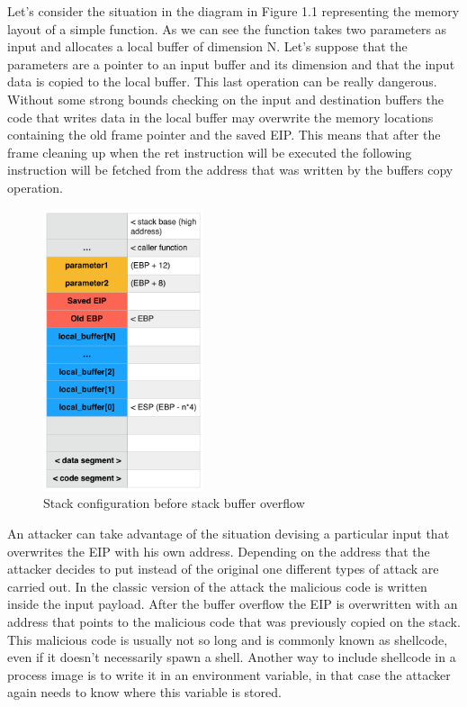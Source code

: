 \documentclass[Lau,binding=0.6cm]{sapthesis}
\begin{document}
Let’s consider the situation in the diagram in Figure 1.1 representing the memory layout of a simple function. As we can see the function takes two parameters as input and allocates a local buffer of dimension N. 
Let’s suppose that the parameters are a pointer to an input buffer and its dimension and that the input data is copied to the local buffer. This last operation can be really dangerous. Without some strong bounds checking on the input and destination buffers the code that writes data in the local buffer may overwrite the memory locations containing the old frame pointer and the saved EIP. This means that after the frame cleaning up when the ret instruction will be executed the following instruction will be fetched from the address that was written by the buffers copy operation.  
\begin{figure}
\centering
\includegraphics[width=0.42\textwidth]{overflow}
\caption{Stack configuration before stack buffer overflow}
\label{fig:largenenough}
\end{figure}
An attacker can take advantage of the situation devising a particular input that overwrites the EIP with his own address. Depending on the address that the attacker decides to put instead of the original one different types of attack are carried out.
In the classic version of the attack the malicious code is written inside the input payload. After the buffer overflow the EIP is overwritten with an address that points to the malicious code that was previously copied on the stack. This malicious code is usually not so long and is commonly known as shellcode, even if it doesn’t necessarily spawn a shell. Another way to include shellcode in a process image is to write it in an environment variable, in that case the attacker again needs to know where this variable is stored.
\end{document}
